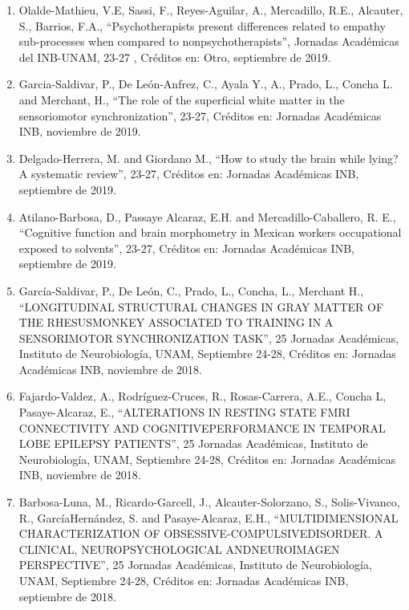 \begin{enumerate}
\item Olalde-Mathieu, V.E, Sassi, F., Reyes-Aguilar, A., Mercadillo, R.E., Alcauter, S., Barrios, F.A., “Psychotherapists present differences 
related to empathy sub-processes when compared to nonpsychotherapists”, Jornadas Académicas del INB-UNAM, 23-27 , Créditos en: Otro, 
septiembre de 2019.

\item Garcia-Saldivar, P., De León-Anfrez, C., Ayala Y., A., Prado, L., Concha L. and Merchant, H., “The role of the superficial white matter 
in 
the sensoriomotor synchronization”, 23-27, Créditos en: Jornadas Académicas INB, noviembre de 2019.

\item Delgado-Herrera, M. and Giordano M., “How to study the brain while lying? A systematic review”, 23-27, Créditos en: Jornadas Académicas 
INB, 
septiembre de 2019.

\item Atilano-Barbosa, D., Passaye Alcaraz, E.H. and Mercadillo-Caballero, R. E., “Cognitive function and brain morphometry in Mexican 
workers 
occupational exposed to solvents”, 23-27, Créditos en: Jornadas Académicas INB, septiembre de 2019.

\item García-Saldivar, P., De León, C., Prado, L., Concha, L., Merchant H., “LONGITUDINAL STRUCTURAL CHANGES IN GRAY MATTER OF THE 
RHESUSMONKEY 
ASSOCIATED TO TRAINING IN A SENSORIMOTOR SYNCHRONIZATION TASK”, 25 Jornadas Académicas, Instituto de Neurobiología, UNAM, Septiembre 24-28, 
Créditos en: Jornadas Académicas INB, noviembre de 2018.

\item Fajardo-Valdez, A., Rodríguez-Cruces, R., Rosas-Carrera, A.E., Concha L, Pasaye-Alcaraz, E., “ALTERATIONS IN RESTING STATE FMRI 
CONNECTIVITY 
AND COGNITIVEPERFORMANCE IN TEMPORAL LOBE EPILEPSY PATIENTS”, 25 Jornadas Académicas, Instituto de Neurobiología, UNAM, Septiembre 24-28, 
Créditos en: Jornadas Académicas INB, noviembre de 2018.

\item Barbosa-Luna, M., Ricardo-Garcell, J., Alcauter-Solorzano, S., Solis-Vivanco, R., GarcíaHernández, S. and Pasaye-Alcaraz, E.H., 
“MULTIDIMENSIONAL CHARACTERIZATION OF OBSESSIVE-COMPULSIVEDISORDER. A CLINICAL, NEUROPSYCHOLOGICAL ANDNEUROIMAGEN PERSPECTIVE”, 25 Jornadas 
Académicas, Instituto de Neurobiología, UNAM, Septiembre 24-28, Créditos en: Jornadas Académicas INB, septiembre de 2018.


\end{enumerate}
